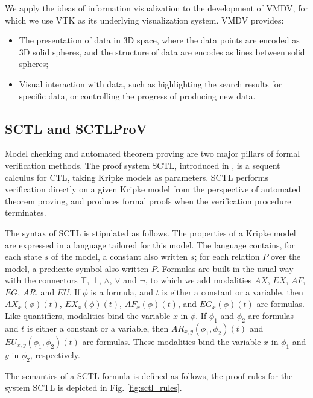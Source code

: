 \documentclass[runningheads]{llncs}
\newcommand\tool[1]{\textsf{#1}}
\begin{document}
{ 
We apply the ideas of information visualization to the development of \textsf{VMDV}, for which we use \tool{VTK} as its underlying visualization system. \tool{VMDV} provides:
\begin{itemize}
       \item The presentation of data in 3D space, where the data points are encoded as 3D solid spheres, and the structure of data are encodes as lines between solid spheres;
       \item Visual interaction with data, such as highlighting the search results for specific data, or controlling the progress of producing new data.
\end{itemize}
}
 
\subsection{\textsf{SCTL} and \textsf{SCTLProV}}
Model checking \cite{CGP01,EmersonC82,EmersonH85} and automated theorem proving
\cite{Fitting96,Loveland78} are two major pillars of formal verification methods.
The proof system \textsf{SCTL}, introduced in \cite{dowek2013logical}, is a sequent calculus for \textsf{CTL},
taking Kripke models as parameters.
\textsf{SCTL} performs verification directly on a given Kripke model from the perspective of automated theorem proving,
and produces formal proofs when the verification procedure terminates.
 
The syntax of \textsf{SCTL} is stipulated as follows.
The properties of a Kripke model are expressed in a language tailored for this model.
The language contains,
for each state $s$ of the model, a constant also written $s$; 
for each relation $P$ over the model, a predicate symbol also written $P$.
Formulas are built in the usual way with the connectors $\top$, $\bot$, $\wedge$, $\vee$ and $\neg$, to which we add modalities $AX$, $EX$, $AF$, $EG$, $AR$, and $EU$. If $\phi$ is a formula, and $t$ is either a constant or a variable, then $AX_x(\phi)(t)$, $EX_x(\phi)(t)$, $AF_x(\phi)(t)$, and $EG_x(\phi)(t)$ are formulas. Like quantifiers, modalities bind the variable $x$ in $\phi$. If $\phi_1$ and $\phi_2$ are formulas and $t$ is either a constant or a variable, then $AR_{x,y}(\phi_1,\phi_2)(t)$ and $EU_{x,y}(\phi_1,\phi_2)(t)$ are formulas. These modalities bind the variable $x$ in $\phi_1$ and $y$ in $\phi_2$, respectively.
 
The semantics of a \textsf{SCTL} formula is defined as follows, 
the proof rules for the system \textsf{SCTL} is depicted in Fig. \ref{fig:sctl_rules}.
 
\end{document}
